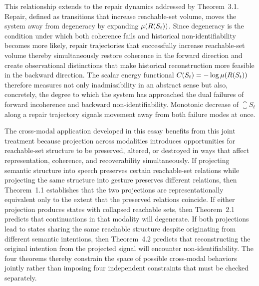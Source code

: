 This relationship extends to the repair dynamics addressed by Theorem~3.1. Repair, defined as transitions that increase reachable-set volume, moves the system away from degeneracy by expanding $\mu(R(S_t))$. Since degeneracy is the condition under which both coherence fails and historical non-identifiability becomes more likely, repair trajectories that successfully increase reachable-set volume thereby simultaneously restore coherence in the forward direction and create observational distinctions that make historical reconstruction more feasible in the backward direction. The scalar energy functional $C(S_t) = -\log \mu(R(S_t))$ therefore measures not only inadmissibility in an abstract sense but also, concretely, the degree to which the system has approached the dual failures of forward incoherence and backward non-identifiability. Monotonic decrease of $\closure{S_t}$ along a repair trajectory signals movement away from both failure modes at once.

The cross-modal application developed in this essay benefits from this joint treatment because projection across modalities introduces opportunities for reachable-set structure to be preserved, altered, or destroyed in ways that affect representation, coherence, and recoverability simultaneously. If projecting semantic structure into speech preserves certain reachable-set relations while projecting the same structure into gesture preserves different relations, then Theorem~1.1 establishes that the two projections are representationally equivalent only to the extent that the preserved relations coincide. If either projection produces states with collapsed reachable sets, then Theorem~2.1 predicts that continuations in that modality will degenerate. If both projections lead to states sharing the same reachable structure despite originating from different semantic intentions, then Theorem~4.2 predicts that reconstructing the original intention from the projected signal will encounter non-identifiability. The four theorems thereby constrain the space of possible cross-modal behaviors jointly rather than imposing four independent constraints that must be checked separately.

